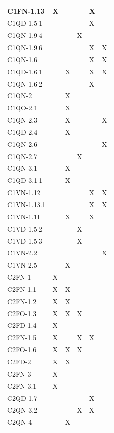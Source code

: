 \begin{footnotesize}
\begin{longtable}{|p{}|p{}|p{}|p{}|p{}|p{}|}
 C1FN-1.13& X&  &  &  X&  \\ \hline
 C1QD-1.5.1& &  &  &  X&  \\ \hline
 C1QN-1.9.4& &  &  X&  &  \\ \hline
 C1QN-1.9.6& &  &  &  X&  X\\ \hline
 C1QN-1.6& &  &  &  X&  X\\ \hline
 C1QD-1.6.1& &  X&  &  X&  X\\ \hline
 C1QN-1.6.2& &  &  &  X&  \\ \hline
 C1QN-2& &  X&  &  &  \\ \hline
 C1QO-2.1& &  X&  &  &  \\ \hline
 C1QN-2.3& &  X&  &  &  X\\ \hline
 C1QD-2.4& &  X&  &  &  \\ \hline
 C1QN-2.6& &  &  &  &  X\\ \hline
 C1QN-2.7& &  &  X&  &  \\ \hline
 C1QN-3.1& &  X&  &  &  \\ \hline
 C1QD-3.1.1& &  X&  &  &  \\ \hline
 C1VN-1.12& &  &  &  X&  X\\ \hline
 C1VN-1.13.1& &  &  &  X&  X\\ \hline
 C1VN-1.11& &  X&  &  X&  \\ \hline
 C1VD-1.5.2& &  &  X&  &  \\ \hline
 C1VD-1.5.3& &  &  X&  &  \\ \hline
 C1VN-2.2& &  &  &  &  X\\ \hline
 C1VN-2.5& &  X&  &  &  \\ \hline
 C2FN-1& X&  &  &  &  \\ \hline
 C2FN-1.1& X&  X&  &  &  \\ \hline
 C2FN-1.2& X&  X&  &  &  \\ \hline
 C2FO-1.3& X&  X&  X&  &  \\ \hline
 C2FD-1.4& X&  &  &  &  \\ \hline
 C2FN-1.5& X&  &  X&  X&  \\ \hline
 C2FO-1.6& X&  X&  X&  &  \\ \hline
 C2FD-2& X&  X&  &  &  \\ \hline
 C2FN-3& X&  &  &  &  \\ \hline
 C2FN-3.1& X&  &  &  &  \\ \hline
 C2QD-1.7& &  &  &  X&  \\ \hline
 C2QN-3.2& &  &  X&  X&  \\ \hline
 C2QN-4& &  X&  &  &  \\ \hline

\end{longtable}
\end{footnotesize}
